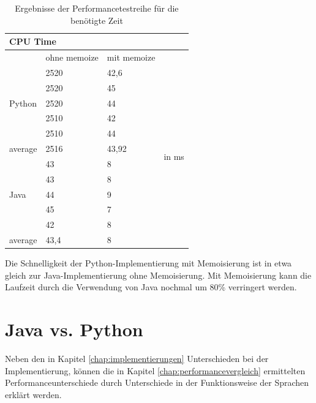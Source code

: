\begin{table}[H]
    \centering
    \begin{tabular}{|l|ll|l|}
        \hline
        \multicolumn{4}{|l|}{\textbf{CPU Time}}                                        \\ \hline
                                & ohne memoize & mit memoize &                         \\ \hline
        \multirow{5}{*}{Python} & 2520         & 42,6        & \multirow{12}{*}{in ms} \\
                                & 2520         & 45          &                         \\
                                & 2520         & 44          &                         \\
                                & 2510         & 42          &                         \\
                                & 2510         & 44          &                         \\ \cline{1-3}
        average                 & 2516         & 43,92       &                         \\ \cline{1-3}
        \multirow{5}{*}{Java}   & 43           & 8           &                         \\
                                & 43           & 8           &                         \\
                                & 44           & 9           &                         \\
                                & 45           & 7           &                         \\
                                & 42           & 8           &                         \\ \cline{1-3}
        average                 & 43,4         & 8           &                         \\ \hline
    \end{tabular}
    \caption{Ergebnisse der Performancetestreihe für die benötigte Zeit}
\end{table}

Die Schnelligkeit der Python-Implementierung mit Memoisierung ist in etwa gleich zur Java-Implementierung 
ohne Memoisierung. Mit Memoisierung kann die Laufzeit durch die Verwendung von Java nochmal um 80\% verringert 
werden.

\section{Java vs. Python}
Neben den in Kapitel \ref{chap:implementierungen} Unterschieden bei der Implementierung, können die in Kapitel 
\ref{chap:performancevergleich} ermittelten Performanceunterschiede durch Unterschiede in der Funktionsweise der 
Sprachen erklärt werden.

